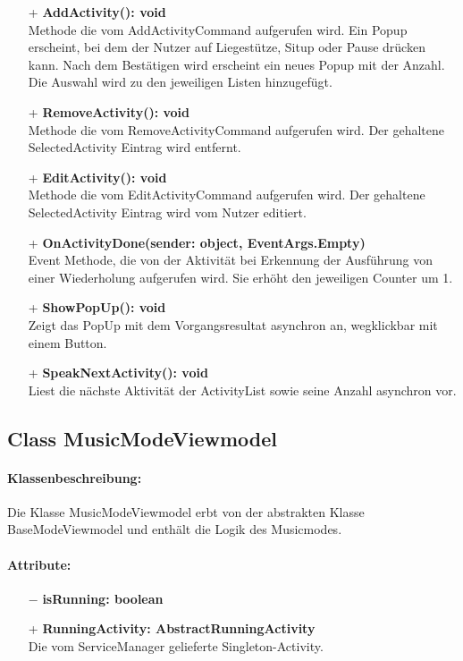 \documentclass[a4paper,12pt]{article}
\begin{document}
\begin{itemize}
	\item[+] \textbf{ AddActivity(): void} \\  Methode die vom AddActivityCommand aufgerufen wird. Ein Popup erscheint, bei dem der Nutzer auf Liegestütze, Situp oder Pause drücken kann. Nach dem Bestätigen wird erscheint ein neues Popup mit der Anzahl. Die Auswahl wird zu den jeweiligen Listen hinzugefügt. 
	\item[+] \textbf{RemoveActivity(): void} \\  Methode die vom RemoveActivityCommand aufgerufen wird. Der gehaltene SelectedActivity Eintrag wird entfernt. 
	\item[+] \textbf{EditActivity(): void} \\ Methode die vom EditActivityCommand aufgerufen wird. Der gehaltene SelectedActivity Eintrag wird vom Nutzer editiert.
	\item[+] \textbf{ OnActivityDone(sender: object, EventArgs.Empty)} \\ Event Methode, die von der Aktivität bei Erkennung der Ausführung von einer Wiederholung aufgerufen wird. Sie erhöht den jeweiligen Counter um 1.  
	\item[+] \textbf{ShowPopUp(): void} \\ Zeigt das PopUp mit dem Vorgangsresultat asynchron an, wegklickbar mit einem Button. 
	\item[+] \textbf{SpeakNextActivity(): void} \\ Liest die nächste Aktivität der ActivityList sowie seine Anzahl asynchron vor. 
\end{itemize}

\subsection{Class MusicModeViewmodel}
\paragraph{Klassenbeschreibung:}
Die Klasse MusicModeViewmodel erbt von der abstrakten Klasse BaseModeViewmodel und enthält die Logik des Musicmodes.
\paragraph{Attribute:}
\begin{itemize}
	\item[$-$] \textbf{isRunning: boolean}
	\item[+] \textbf{RunningActivity: AbstractRunningActivity} \\ Die vom ServiceManager gelieferte Singleton-Activity.
\end{itemize}
\end{document}
